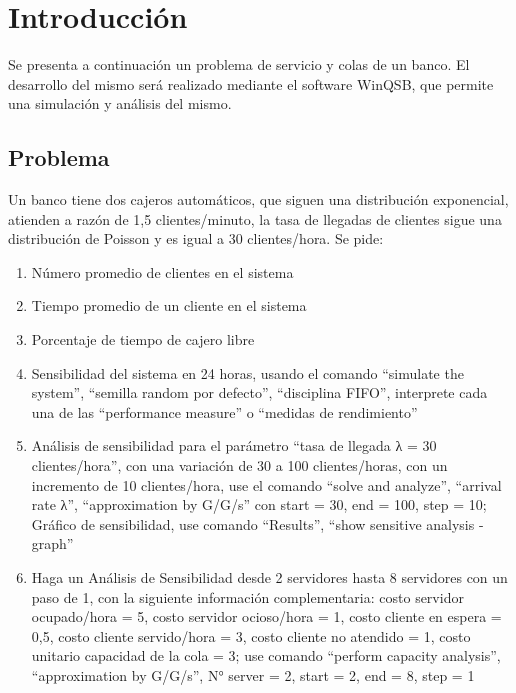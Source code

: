 \section{Introducción}
Se presenta a continuación un problema de servicio y colas de un banco. El desarrollo del mismo será realizado mediante el software WinQSB, que permite una simulación y análisis del mismo.

\subsection{Problema}
Un banco tiene dos cajeros automáticos, que siguen una distribución exponencial, atienden a razón de 1,5 clientes/minuto, la tasa de llegadas de clientes sigue una distribución de Poisson y es igual a 30 clientes/hora. Se pide:

\begin{enumerate}[label=\Alph*]
    \item Número promedio de clientes en el sistema
    \item Tiempo promedio de un cliente en el sistema
    \item Porcentaje de tiempo de cajero libre
    \item Sensibilidad del sistema en 24 horas, usando el comando “simulate the system”, “semilla random por defecto”, “disciplina FIFO”, interprete cada una de las “performance measure” o “medidas de rendimiento”
    \item Análisis de sensibilidad para el parámetro “tasa de llegada λ = 30 clientes/hora”, con una variación de 30 a 100 clientes/horas, con un incremento de 10 clientes/hora, use el comando “solve and analyze”, “arrival rate λ”, “approximation by G/G/s” con start = 30, end = 100, step = 10; Gráfico de sensibilidad, use comando “Results”, “show sensitive analysis - graph”
    \item Haga un Análisis de Sensibilidad desde 2 servidores hasta 8 servidores con un paso de 1, con la siguiente información complementaria: costo servidor ocupado/hora = 5, costo servidor ocioso/hora = 1, costo cliente en espera = 0,5, costo cliente servido/hora = 3, costo cliente no atendido = 1, costo unitario capacidad de la cola = 3; use comando “perform capacity analysis”, “approximation by G/G/s”, N° server = 2, start = 2, end = 8, step = 1
\end{enumerate}

\pagebreak